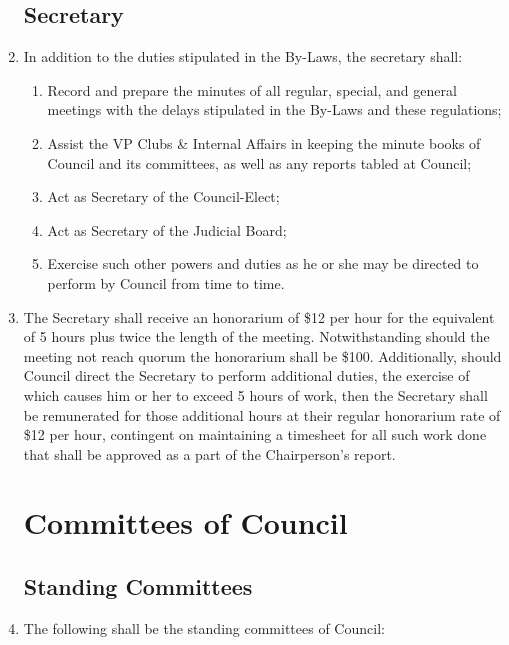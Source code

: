 \documentclass[oneside]{book}
\begin{document}
\begin{enumerate}
\section{\label{Secretary}Secretary }
\item In addition to the duties stipulated in the By-Laws, the secretary
shall: 

\begin{enumerate}
\item Record and prepare the minutes of all regular, special, and general
meetings with the delays stipulated in the By-Laws and these regulations; 
\item Assist the VP Clubs \& Internal Affairs in keeping the minute books of 
Council and its committees, as well as any reports tabled at Council; 
\item Act as Secretary of the Council-Elect; 
\item Act as Secretary of the Judicial Board;
\item Exercise such other powers and duties as he or she may be directed
to perform by Council from time to time. 
\end{enumerate}
\item The Secretary shall receive an honorarium of \$12 per hour for the
equivalent of 5 hours plus twice the length of the meeting. Notwithstanding
should the meeting not reach quorum the honorarium shall be \$100. Additionally, 
should Council direct the Secretary to perform additional duties, the exercise 
of which causes him or her to exceed 5 hours of work, then the Secretary shall 
be remunerated for those additional hours at their regular honorarium rate of 
\$12 per hour, contingent on maintaining a timesheet for all such work done that 
shall be approved as a part of the Chairperson’s report.

\chapter{\label{Committees_of_Council}Committees of Council }


\section{\label{Standing_Committees}Standing Committees }
\item The following shall be the standing committees of Council: 


\end{enumerate}
\end{document}
